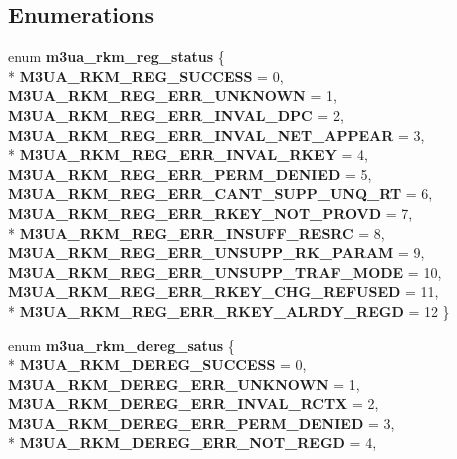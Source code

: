 \subsection*{Enumerations}
\begin{DoxyCompactItemize}
\item 
enum {\bf m3ua\+\_\+rkm\+\_\+reg\+\_\+status} \{ \\*
{\bf M3\+U\+A\+\_\+\+R\+K\+M\+\_\+\+R\+E\+G\+\_\+\+S\+U\+C\+C\+E\+SS} = 0, 
{\bf M3\+U\+A\+\_\+\+R\+K\+M\+\_\+\+R\+E\+G\+\_\+\+E\+R\+R\+\_\+\+U\+N\+K\+N\+O\+WN} = 1, 
{\bf M3\+U\+A\+\_\+\+R\+K\+M\+\_\+\+R\+E\+G\+\_\+\+E\+R\+R\+\_\+\+I\+N\+V\+A\+L\+\_\+\+D\+PC} = 2, 
{\bf M3\+U\+A\+\_\+\+R\+K\+M\+\_\+\+R\+E\+G\+\_\+\+E\+R\+R\+\_\+\+I\+N\+V\+A\+L\+\_\+\+N\+E\+T\+\_\+\+A\+P\+P\+E\+AR} = 3, 
\\*
{\bf M3\+U\+A\+\_\+\+R\+K\+M\+\_\+\+R\+E\+G\+\_\+\+E\+R\+R\+\_\+\+I\+N\+V\+A\+L\+\_\+\+R\+K\+EY} = 4, 
{\bf M3\+U\+A\+\_\+\+R\+K\+M\+\_\+\+R\+E\+G\+\_\+\+E\+R\+R\+\_\+\+P\+E\+R\+M\+\_\+\+D\+E\+N\+I\+ED} = 5, 
{\bf M3\+U\+A\+\_\+\+R\+K\+M\+\_\+\+R\+E\+G\+\_\+\+E\+R\+R\+\_\+\+C\+A\+N\+T\+\_\+\+S\+U\+P\+P\+\_\+\+U\+N\+Q\+\_\+\+RT} = 6, 
{\bf M3\+U\+A\+\_\+\+R\+K\+M\+\_\+\+R\+E\+G\+\_\+\+E\+R\+R\+\_\+\+R\+K\+E\+Y\+\_\+\+N\+O\+T\+\_\+\+P\+R\+O\+VD} = 7, 
\\*
{\bf M3\+U\+A\+\_\+\+R\+K\+M\+\_\+\+R\+E\+G\+\_\+\+E\+R\+R\+\_\+\+I\+N\+S\+U\+F\+F\+\_\+\+R\+E\+S\+RC} = 8, 
{\bf M3\+U\+A\+\_\+\+R\+K\+M\+\_\+\+R\+E\+G\+\_\+\+E\+R\+R\+\_\+\+U\+N\+S\+U\+P\+P\+\_\+\+R\+K\+\_\+\+P\+A\+R\+AM} = 9, 
{\bf M3\+U\+A\+\_\+\+R\+K\+M\+\_\+\+R\+E\+G\+\_\+\+E\+R\+R\+\_\+\+U\+N\+S\+U\+P\+P\+\_\+\+T\+R\+A\+F\+\_\+\+M\+O\+DE} = 10, 
{\bf M3\+U\+A\+\_\+\+R\+K\+M\+\_\+\+R\+E\+G\+\_\+\+E\+R\+R\+\_\+\+R\+K\+E\+Y\+\_\+\+C\+H\+G\+\_\+\+R\+E\+F\+U\+S\+ED} = 11, 
\\*
{\bf M3\+U\+A\+\_\+\+R\+K\+M\+\_\+\+R\+E\+G\+\_\+\+E\+R\+R\+\_\+\+R\+K\+E\+Y\+\_\+\+A\+L\+R\+D\+Y\+\_\+\+R\+E\+GD} = 12
 \}
\item 
enum {\bf m3ua\+\_\+rkm\+\_\+dereg\+\_\+satus} \{ \\*
{\bf M3\+U\+A\+\_\+\+R\+K\+M\+\_\+\+D\+E\+R\+E\+G\+\_\+\+S\+U\+C\+C\+E\+SS} = 0, 
{\bf M3\+U\+A\+\_\+\+R\+K\+M\+\_\+\+D\+E\+R\+E\+G\+\_\+\+E\+R\+R\+\_\+\+U\+N\+K\+N\+O\+WN} = 1, 
{\bf M3\+U\+A\+\_\+\+R\+K\+M\+\_\+\+D\+E\+R\+E\+G\+\_\+\+E\+R\+R\+\_\+\+I\+N\+V\+A\+L\+\_\+\+R\+C\+TX} = 2, 
{\bf M3\+U\+A\+\_\+\+R\+K\+M\+\_\+\+D\+E\+R\+E\+G\+\_\+\+E\+R\+R\+\_\+\+P\+E\+R\+M\+\_\+\+D\+E\+N\+I\+ED} = 3, 
\\*
{\bf M3\+U\+A\+\_\+\+R\+K\+M\+\_\+\+D\+E\+R\+E\+G\+\_\+\+E\+R\+R\+\_\+\+N\+O\+T\+\_\+\+R\+E\+GD} = 4, 

\end{DoxyCompactItemize}
